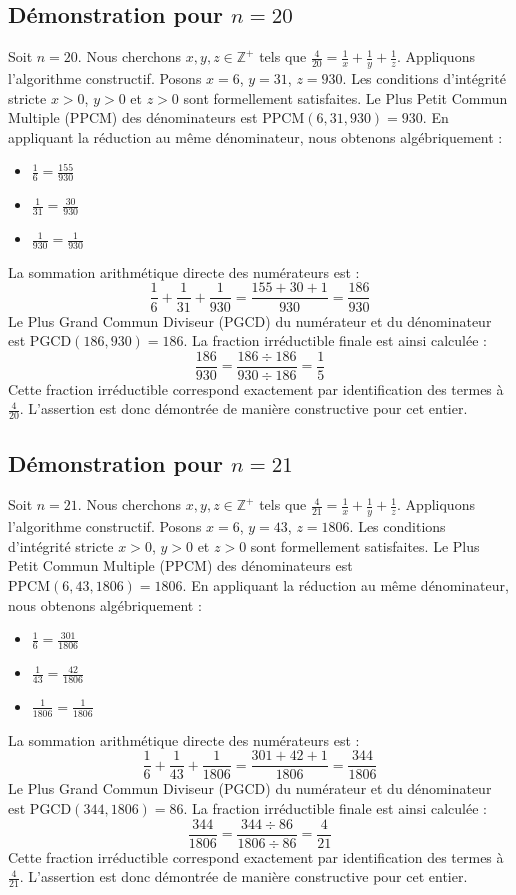 \documentclass[11pt,a4paper]{article}
\begin{document}
\subsection{Démonstration pour $n = 20$}
Soit $n = 20$. Nous cherchons $x, y, z \in \mathbb{Z}^{+}$ tels que $\frac{4}{20} = \frac{1}{x} + \frac{1}{y} + \frac{1}{z}$.
Appliquons l'algorithme constructif. Posons $x = 6$, $y = 31$, $z = 930$.
Les conditions d'intégrité stricte $x > 0$, $y > 0$ et $z > 0$ sont formellement satisfaites.
Le Plus Petit Commun Multiple (PPCM) des dénominateurs est $\text{PPCM}(6, 31, 930) = 930$.
En appliquant la réduction au même dénominateur, nous obtenons algébriquement :
\begin{itemize}
    \item $\frac{1}{6} = \frac{155}{930}$
    \item $\frac{1}{31} = \frac{30}{930}$
    \item $\frac{1}{930} = \frac{1}{930}$
\end{itemize}
La sommation arithmétique directe des numérateurs est :
$$ \frac{1}{6} + \frac{1}{31} + \frac{1}{930} = \frac{155 + 30 + 1}{930} = \frac{186}{930} $$
Le Plus Grand Commun Diviseur (PGCD) du numérateur et du dénominateur est $\text{PGCD}(186, 930) = 186$.
La fraction irréductible finale est ainsi calculée :
$$ \frac{186}{930} = \frac{186 \div 186}{930 \div 186} = \frac{1}{5} $$
Cette fraction irréductible correspond exactement par identification des termes à $\frac{4}{20}$. L'assertion est donc démontrée de manière constructive pour cet entier.

\subsection{Démonstration pour $n = 21$}
Soit $n = 21$. Nous cherchons $x, y, z \in \mathbb{Z}^{+}$ tels que $\frac{4}{21} = \frac{1}{x} + \frac{1}{y} + \frac{1}{z}$.
Appliquons l'algorithme constructif. Posons $x = 6$, $y = 43$, $z = 1806$.
Les conditions d'intégrité stricte $x > 0$, $y > 0$ et $z > 0$ sont formellement satisfaites.
Le Plus Petit Commun Multiple (PPCM) des dénominateurs est $\text{PPCM}(6, 43, 1806) = 1806$.
En appliquant la réduction au même dénominateur, nous obtenons algébriquement :
\begin{itemize}
    \item $\frac{1}{6} = \frac{301}{1806}$
    \item $\frac{1}{43} = \frac{42}{1806}$
    \item $\frac{1}{1806} = \frac{1}{1806}$
\end{itemize}
La sommation arithmétique directe des numérateurs est :
$$ \frac{1}{6} + \frac{1}{43} + \frac{1}{1806} = \frac{301 + 42 + 1}{1806} = \frac{344}{1806} $$
Le Plus Grand Commun Diviseur (PGCD) du numérateur et du dénominateur est $\text{PGCD}(344, 1806) = 86$.
La fraction irréductible finale est ainsi calculée :
$$ \frac{344}{1806} = \frac{344 \div 86}{1806 \div 86} = \frac{4}{21} $$
Cette fraction irréductible correspond exactement par identification des termes à $\frac{4}{21}$. L'assertion est donc démontrée de manière constructive pour cet entier.
\end{document}
